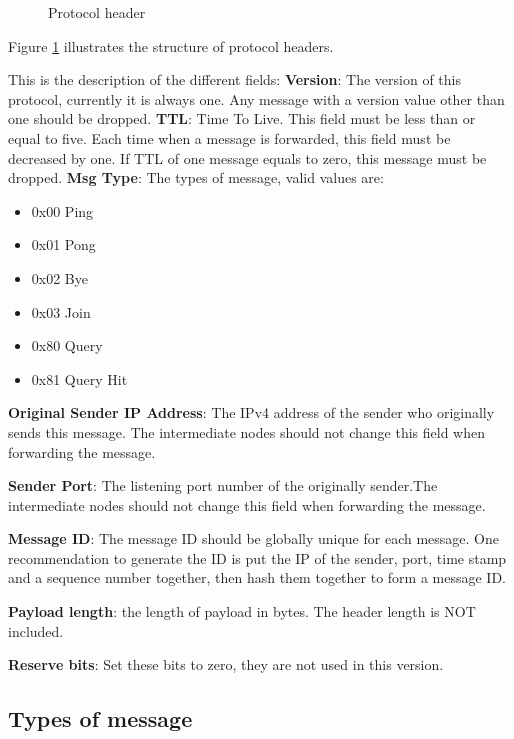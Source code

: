 \documentclass[12pt, a4paper]{article}
\begin{document}
\begin{figure}[h!]
  \centering
  \theverbbox
  \caption{Protocol header}
    \label{fig:header}
\end{figure}

Figure \ref{fig:header} illustrates the structure of protocol headers.

This is the description of the different fields:
\textbf{Version}: The version of this protocol, currently it is always one. Any message with a version value other than one should be dropped.
\textbf{TTL}: Time To Live. This field must be less than or equal to five. Each time when a message is forwarded, this field must be decreased by one. If TTL of one message equals to zero, this message must be dropped.
\textbf{Msg Type}: The types of message, valid values are:
\begin{itemize}
\item 0x00 Ping
\item 0x01 Pong
\item 0x02 Bye
\item 0x03 Join
\item 0x80 Query
\item 0x81 Query Hit
\end{itemize}
\textbf{Original Sender IP Address}: The IPv4 address of the sender who originally sends this message. The intermediate nodes should not change this field when forwarding the message.

\textbf{Sender Port}: The listening port number of the originally sender.The intermediate nodes should not change this field when forwarding the message.

\textbf{Message ID}: The message ID should be globally unique for each message. One recommendation to generate the ID is put the IP of the sender, port, time stamp and a sequence number together, then hash them together to form a message ID.

\textbf{Payload length}: the length of payload in bytes. The header length is NOT included.

\textbf{Reserve bits}: Set these bits to zero, they are not used in this version.
\subsection{Types of message}
\end{document}
